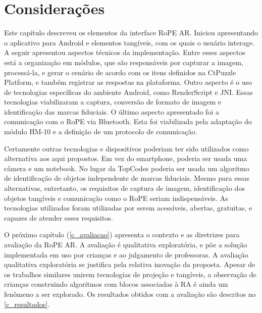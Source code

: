 \section{Considerações}

Este capítulo descreveu os elementos da interface RoPE AR. Iniciou apresentando o aplicativo para Android e elementos tangíveis, com os quais o usuário interage. A seguir apresentou aspectos técnicos da implementação. Entre esses aspectos está a organização em módulos, que são responsáveis por capturar a imagem, processá-la, e gerar o cenário de acordo com os itens definidos na CtPuzzle Platform, e também registrar as respostas na plataforma. Outro aspecto é o uso de tecnologias específicas do ambiente Android, como RenderScript e JNI. Essas tecnologias viabilizaram a captura, conversão de formato de imagem e identificação das marcas fiduciais. O último aspecto apresentado foi a comunicação com o RoPE via Bluetooth. Esta foi viabilizada pela adaptação do módulo HM-10 e a definição de um protocolo de comunicação.

Certamente outras tecnologias e dispositivos poderiam ter sido utilizados como alternativa aos aqui propostos. Em vez do smartphone, poderia ser usada uma câmera e um notebook. No lugar da TopCodes poderia ser usada um algoritmo de identificação de objetos independente de marcas fiduciais. Mesmo para essas alternativas, entretanto, os requisitos de captura de imagem, identificação dos objetos tangíveis e comunicação como o RoPE seriam indispensáveis. As tecnologias utilizadas foram utilizadas por serem acessíveis, abertas, gratuitas, e capazes de atender esses requisitos.


O próximo capítulo (\autoref{c_avaliacao}) apresenta o contexto e as diretrizes para avaliação da RoPE AR. A avaliação é qualitativa exploratória, e põe a solução implementada em uso por crianças e ao julgamento de professoras. A avaliação qualitativa exploratória se justifica pela relativa inovação da proposta. Apesar de os trabalhos similares unirem tecnologias de projeção e tangíveis, a observação de crianças construindo algoritmos com blocos associadas à RA é ainda um fenômeno a ser explorado. Os resultados obtidos com a avaliação são descritos no \autoref{c_resultados}.